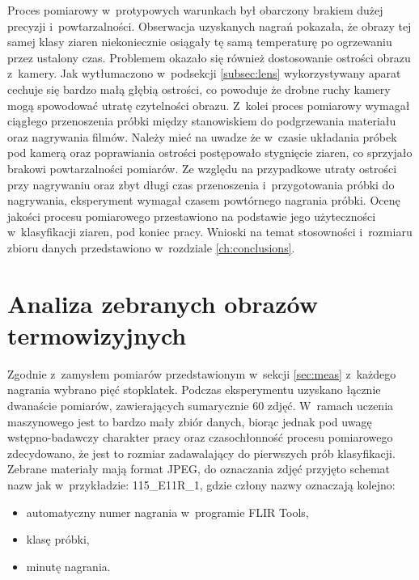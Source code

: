 Proces pomiarowy w~protypowych warunkach był obarczony brakiem dużej precyzji
i~powtarzalności.
Obserwacja uzyskanych nagrań pokazała, że obrazy tej samej klasy ziaren
niekoniecznie osiągały tę samą temperaturę po ogrzewaniu przez ustalony czas.
Problemem okazało się również dostosowanie ostrości obrazu z~kamery.
Jak wytłumaczono w~podsekcji \ref{subsec:lens} wykorzystywany aparat cechuje
się bardzo małą głębią ostrości, co powoduje że drobne ruchy kamery
mogą spowodować utratę czytelności obrazu.
Z~kolei proces pomiarowy wymagał ciągłego przenoszenia próbki między
stanowiskiem do podgrzewania materiału oraz nagrywania filmów.
Należy mieć na uwadze że w~czasie układania próbek pod kamerą oraz poprawiania
ostrości postępowało stygnięcie ziaren, co sprzyjało brakowi powtarzalności
pomiarów.
Ze względu na przypadkowe utraty ostrości przy nagrywaniu oraz zbyt długi czas
przenoszenia i~przygotowania próbki do nagrywania, eksperyment wymagał czasem
powtórnego nagrania próbki.
Ocenę jakości procesu pomiarowego przestawiono na podstawie jego użyteczności
w~klasyfikacji ziaren, pod koniec pracy.
Wnioski na temat stosowności i~rozmiaru zbioru danych przedstawiono
w~rozdziale \ref{ch:conclusions}.

\section{Analiza zebranych obrazów termowizyjnych}
Zgodnie z~zamysłem pomiarów przedstawionym w~sekcji \ref{sec:meas} z~każdego
nagrania wybrano pięć stopklatek.
Podczas eksperymentu uzyskano łącznie dwanaście pomiarów, zawierających
sumarycznie 60 zdjęć.
W~ramach uczenia maszynowego jest to bardzo mały zbiór danych, biorąc jednak
pod uwagę wstępno-badawczy charakter pracy oraz czasochłonność procesu 
pomiarowego zdecydowano, że jest to rozmiar zadawalający do pierwszych
prób klasyfikacji.
Zebrane materiały mają format JPEG, do oznaczania zdjęć przyjęto schemat
nazw jak w~przykładzie: 115\_E11R\_1, gdzie człony nazwy oznaczają kolejno:
\begin{itemize}
	\item automatyczny numer nagrania w~programie FLIR Tools,
	\item klasę próbki,
	\item minutę nagrania.
\end{itemize}

